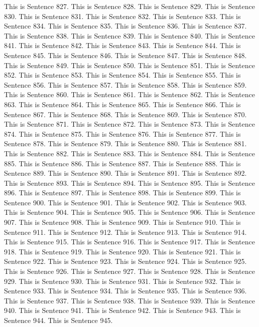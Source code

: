 \documentclass{article}
\begin{document}
This is Sentence 827.
This is Sentence 828.
This is Sentence 829.
This is Sentence 830.
This is Sentence 831.
This is Sentence 832.
This is Sentence 833.
This is Sentence 834.
This is Sentence 835.
This is Sentence 836.
This is Sentence 837.
This is Sentence 838.
This is Sentence 839.
This is Sentence 840.
This is Sentence 841.
This is Sentence 842.
This is Sentence 843.
This is Sentence 844.
This is Sentence 845.
This is Sentence 846.
This is Sentence 847.
This is Sentence 848.
This is Sentence 849.
This is Sentence 850.
This is Sentence 851.
This is Sentence 852.
This is Sentence 853.
This is Sentence 854.
This is Sentence 855.
This is Sentence 856.
This is Sentence 857.
This is Sentence 858.
This is Sentence 859.
This is Sentence 860.
This is Sentence 861.
This is Sentence 862.
This is Sentence 863.
This is Sentence 864.
This is Sentence 865.
This is Sentence 866.
This is Sentence 867.
This is Sentence 868.
This is Sentence 869.
This is Sentence 870.
This is Sentence 871.
This is Sentence 872.
This is Sentence 873.
This is Sentence 874.
This is Sentence 875.
This is Sentence 876.
This is Sentence 877.
This is Sentence 878.
This is Sentence 879.
This is Sentence 880.
This is Sentence 881.
This is Sentence 882.
This is Sentence 883.
This is Sentence 884.
This is Sentence 885.
This is Sentence 886.
This is Sentence 887.
This is Sentence 888.
This is Sentence 889.
This is Sentence 890.
This is Sentence 891.
This is Sentence 892.
This is Sentence 893.
This is Sentence 894.
This is Sentence 895.
This is Sentence 896.
This is Sentence 897.
This is Sentence 898.
This is Sentence 899.
This is Sentence 900.
This is Sentence 901.
This is Sentence 902.
This is Sentence 903.
This is Sentence 904.
This is Sentence 905.
This is Sentence 906.
This is Sentence 907.
This is Sentence 908.
This is Sentence 909.
This is Sentence 910.
This is Sentence 911.
This is Sentence 912.
This is Sentence 913.
This is Sentence 914.
This is Sentence 915.
This is Sentence 916.
This is Sentence 917.
This is Sentence 918.
This is Sentence 919.
This is Sentence 920.
This is Sentence 921.
This is Sentence 922.
This is Sentence 923.
This is Sentence 924.
This is Sentence 925.
This is Sentence 926.
This is Sentence 927.
This is Sentence 928.
This is Sentence 929.
This is Sentence 930.
This is Sentence 931.
This is Sentence 932.
This is Sentence 933.
This is Sentence 934.
This is Sentence 935.
This is Sentence 936.
This is Sentence 937.
This is Sentence 938.
This is Sentence 939.
This is Sentence 940.
This is Sentence 941.
This is Sentence 942.
This is Sentence 943.
This is Sentence 944.
This is Sentence 945.
\end{document}
